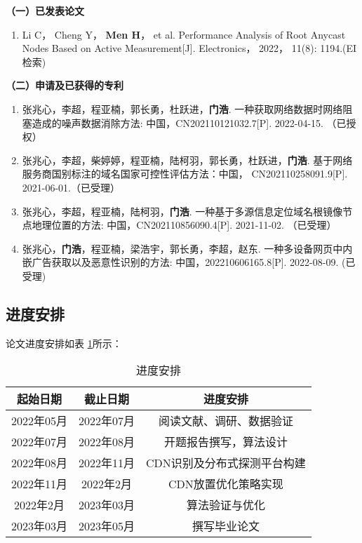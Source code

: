 	\noindent\textbf{（一）已发表论文}
	\begin{enumerate}
	\item Li C， Cheng Y， \textbf{Men H}， et al. Performance Analysis of Root Anycast Nodes Based on Active Measurement[J]. Electronics， 2022， 11(8): 1194.(EI检索)
\end{enumerate}
\noindent\textbf{（二）申请及已获得的专利}
\begin{enumerate}
\item 张兆心，李超，程亚楠，郭长勇，杜跃进，\textbf{门浩}. 一种获取网络数据时网络阻塞造成的噪声数据消除方法: 中国，CN202110121032.7[P]. 2022-04-15. （已授权）
\item 张兆心，李超，柴婷婷，程亚楠，陆柯羽，郭长勇，杜跃进，\textbf{门浩}. 基于网络服务商国别标注的域名国家可控性评估方法：中国， CN202110258091.9[P]. 2021-06-01.（已受理）
\item 张兆心，李超，程亚楠，陆柯羽，\textbf{门浩}. 一种基于多源信息定位域名根镜像节点地理位置的方法: 中国，CN202110856090.4[P]. 2021-11-02. （已受理）
\item 张兆心，\textbf{门浩}，程亚楠，梁浩宇，郭长勇，李超，赵东. 一种多设备网页中内嵌广告获取以及恶意性识别的方法: 中国，202210606165.8[P]. 2022-08-09. (已受理)
\end{enumerate}

 
\subsection{进度安排}
论文进度安排如表 \ref{table:jinduanpai}所示：


\begin{table}[htbp]
	\centering
	\caption{进度安排}\label{table:jinduanpai}
	\vspace{0.5em}\wuhao
	\begin{tabular}{ccc}
		\toprule
		起始日期        & 截止日期     & 进度安排    \\
		\midrule
		2022年05月           & 2022年07月           & 阅读文献、调研、数据验证      \\
		2022年07月          & 2022年08月  & 开题报告撰写，算法设计  \\
		2022年08月         & 2022年11月   & CDN识别及分布式探测平台构建  \\
		2022年11月         & 2022年2月   & CDN放置优化策略实现  \\
		2022年2月           & 2023年03月  & 算法验证与优化 \\
		2023年03月          & 2023年05月 &      撰写毕业论文     \\


		\bottomrule
	\end{tabular}
\end{table}


\FloatBarrier




